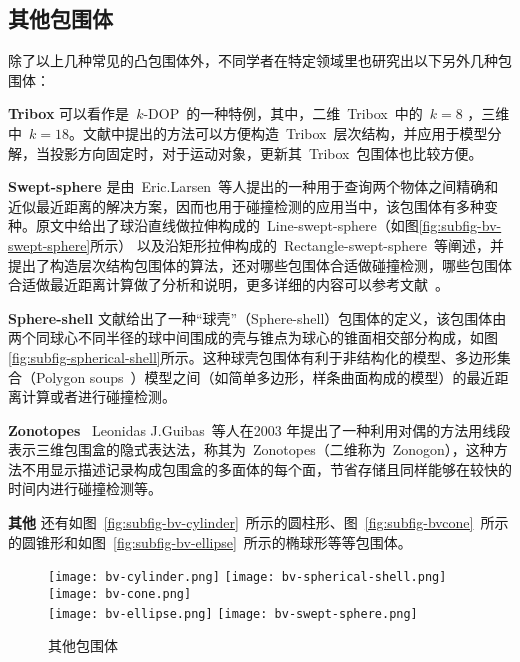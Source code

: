 \subsection{其他包围体}

除了以上几种常见的凸包围体外，不同学者在特定领域里也研究出以下另外几种包围体：\\
\begin{inparaenum}[(1)]
\indent
\item \textbf{Tribox} 可以看作是~$k$-DOP~的一种特例，其中，二维~Tribox~中的~$k=8$ ，三维中~$k=18$。文献中提出的方法可以方便构造~Tribox~层次结构，并应用于模型分解，当投影方向固定时，对于运动对象，更新其~Tribox~包围体也比较方便。 \\ 
\indent
\item \textbf{Swept-sphere}
是由~Eric.Larsen~等人\cite{Larsen1999Fast}提出的一种用于查询两个物体之间精确和近似最近距离的解决方案，因而也用于碰撞检测的应用当中，该包围体有多种变种。原文中给出了球沿直线做拉伸构成的~Line-swept-sphere（如图\ref{fig:subfig-bv-swept-sphere}所示）
以及沿矩形拉伸构成的~Rectangle-swept-sphere~等阐述，并提出了构造层次结构包围体的算法，还对哪些包围体合适做碰撞检测，哪些包围体合适做最近距离计算做了分析和说明，更多详细的内容可以参考文献~。\\
\indent
\item \textbf{Sphere-shell}
文献给出了一种“球壳”（Sphere-shell）包围体的定义，该包围体由两个同球心不同半径的球中间围成的壳与锥点为球心的锥面相交部分构成，如图\ref{fig:subfig-spherical-shell}所示。这种球壳包围体有利于非结构化的模型、多边形集合（Polygon
soups~）模型之间（如简单多边形，样条曲面构成的模型）的最近距离计算或者进行碰撞检测。\\
\indent
\item \textbf{Zonotopes} ~Leonidas
J.Guibas~\cite{Guibas2003Zonotopes}等人在2003 年提出了一种利用对偶的方法用线段表示三维包围盒的隐式表达法，称其为~Zonotopes（二维称为~Zonogon），这种方法不用显示描述记录构成包围盒的多面体的每个面，节省存储且同样能够在较快的时间内进行碰撞检测等。\\
\indent
\item \textbf{其他}
还有如图~\ref{fig:subfig-bv-cylinder}~所示的圆柱形\cite{Schomer2000Smallest}、图~\ref{fig:subfig-bvcone}~所示的圆锥形\cite{held1997erit}和如图~\ref{fig:subfig-bv-ellipse}~所示的椭球形\cite{Wang2004Efficient}等等包围体。
\end{inparaenum}
\begin{figure}[H]
  \centering%
    {\texttt{[image: bv-cylinder.png]}}
    {\texttt{[image: bv-spherical-shell.png]}}
    {\texttt{[image: bv-cone.png]}}
  \\
    {\texttt{[image: bv-ellipse.png]}}
    {\texttt{[image: bv-swept-sphere.png]}}
  \caption{其他包围体}
  \label{fig:bv-others}
\end{figure}


